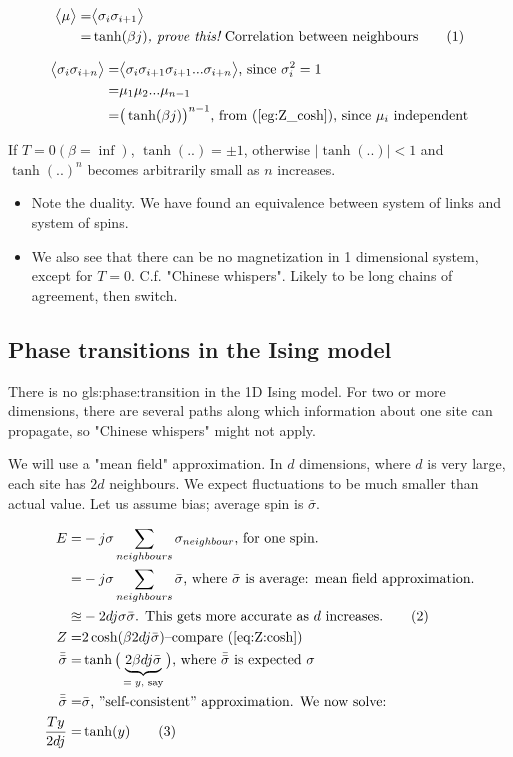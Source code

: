 \documentclass[]{article}
\newcommand\numberthis{\addtocounter{equation}{1}\tag{\theequation}}
\begin{document}
\begin{align*}
\big< \mu \big> =& \big< \sigma_i \sigma_{i+1} \big>\\
=& \tanh(\beta j) \textit{, prove this!}\text{ Correlation between neighbours}\numberthis \label{eg:Z_cosh}
\end{align*}

\begin{align*}
\big < \sigma_i \sigma_{i+n} \big> =&  \big < \sigma_i \sigma_{i+1} \sigma_{i+1}... \sigma_{i+n} \big>\text{, since $\sigma_i^2 = 1$}\\
=& \mu_1 \mu_2 ... \mu_{n-1}\\
=& \big( \tanh(\beta j)\big)^{n-1}\text{, from (\ref{eg:Z_cosh}), since $\mu_i$ independent}
\end{align*}

If $T=0(\beta=\inf)$, $\tanh(..)=\pm1$, otherwise $\lvert \tanh(..) \rvert<1$ and $\tanh(..)^n$ becomes arbitrarily small as $n$ increases.

\begin{itemize}
	\item Note the duality. We have found an equivalence between system of links and system of spins. 
	\item We also see that there can be no magnetization in 1 dimensional system, except for $T=0$. C.f. "Chinese whispers". Likely to be long chains of agreement, then switch.
\end{itemize}
 

\subsection{Phase transitions in the Ising model}

There is no \gls{gls:phase:transition} in the 1D Ising model. For two or more dimensions, there are several paths along which information about one site can propagate, so "Chinese whispers" might not apply.

We will use a "mean field" approximation. In $d$ dimensions, where $d$ is very large, each site has $2d$ neighbours. We expect fluctuations to be much smaller than actual value. Let us assume bias; average spin is $\bar{\sigma}$.

\begin{align*}
E =& -j \sigma \sum_{neighbours} \sigma_{neighbour} \text{, for one spin.}\\
=& -j \sigma \sum_{neighbours} \bar{\sigma}\text{, where $\bar{\sigma}$ is average: mean field approximation.}\\
\approxeq &-2 d j \sigma \bar{\sigma}\text{. This gets more accurate as $d$ increases.} \numberthis \label{eq:E:sigma}\\
Z =& 2 \cosh(\beta 2 d j \bar{\sigma}) \text{--compare (\ref{eq:Z:cosh})}\\
\bar{\bar{\sigma}} =& \tanh\big(\underbrace{2 \beta d j  \bar{\sigma}}_\text{$=y$, say}\big) \text{, where $\bar{\bar{\sigma}}$ is expected $\sigma$} \\
\bar{\bar{\sigma}} =& \bar{\sigma} \text{, ''self-consistent'' approximation. We now solve:}\\
\frac{T y}{2 d j} =& \tanh(y)\numberthis \label{eq:tanh_mean_field}
\end{align*}  
\end{document}
